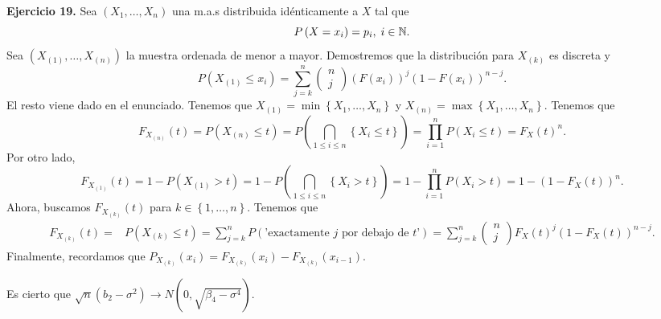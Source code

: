 \begin{eg}
\textbf{Ejercicio 19.} Sea $\displaystyle \left(X_{1}, \ldots, X_{n}\right) $ una m.a.s distribuida idénticamente a $\displaystyle X $ tal que 
\[P\left(X = x_{i}\right) = p_{i}, \; i \in \mathbb{N} .\]
Sea $\displaystyle \left(X_{\left(1\right)}, \ldots, X_{\left(n\right)}\right) $ la muestra ordenada de menor a mayor. Demostremos que la distribución para $\displaystyle X_{\left(k\right)} $ es discreta y 
\[P\left(X_{\left(1\right)} \leq x_{i}\right) = \sum^{n}_{j = k}\begin{pmatrix} n \\ j \end{pmatrix}\left(F\left(x_{i}\right)\right)^{j}\left(1-F\left(x_{i}\right)\right)^{n-j} .\]
El resto viene dado en el enunciado. Tenemos que $\displaystyle X_{\left(1\right)} = \min \left\{ X_{1}, \ldots, X_{n}\right\}  $ y $\displaystyle X_{\left(n\right)} = \max \left\{ X_{1}, \ldots, X_{n}\right\}  $. 
Tenemos que 
\[F_{X_{\left(n\right)}}\left(t\right) = P\left(X_{\left(n\right)} \leq t\right) = P\left(\bigcap_{1 \leq i \leq n} \left\{ X_{i} \leq t\right\} \right) = \prod^{n}_{i = 1}P\left(X_{i} \leq t\right) = F_{X}\left(t\right)^{n} .\]
Por otro lado,
\[F_{X_{\left(1\right)}}\left(t\right) = 1 - P\left(X_{\left(1\right)} > t\right) = 1 - P\left(\bigcap_{1 \leq i \leq n} \left\{ X_{i} > t\right\} \right) = 1 - \prod^{n}_{i = 1}P\left(X_{i} > t\right) = 1 - \left(1 - F_{X}\left(t\right)\right)^{n} .\]
Ahora, buscamos $\displaystyle F_{X_{\left(k\right)}}\left(t\right) $ para $\displaystyle k \in \left\{ 1, \ldots, n\right\}  $. Tenemos que
\[
\begin{split}
	F_{X_{\left(k\right)}}\left(t\right) = & P\left(X_{\left(k\right)} \leq t\right) = \sum^{n}_{j = k}P\left(\text{'exactamente $\displaystyle j $ por debajo de $\displaystyle t $'}\right) = \sum^{n}_{j = k} \begin{pmatrix} n \\ j\end{pmatrix}F_{X}\left(t\right)^{j}\left(1-F_{X}\left(t\right)\right)^{n-j}.
\end{split}
\]
Finalmente, recordamos que $\displaystyle P_{X_{\left(k\right)}}\left(x_{i}\right) = F_{X_{\left(k\right)}}\left(x_{i}\right) - F_{X_{\left(k\right)}}\left(x_{i-1}\right) $. 
\end{eg}
\begin{theorem}
Es cierto que $\displaystyle \sqrt{n}\left(b_{2}-\sigma^{2}\right) \to N\left(0, \sqrt{\beta_{4}-\sigma^{4}}\right) $. 
\end{theorem}
